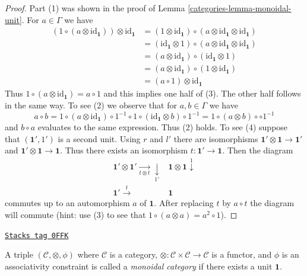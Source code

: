 \begin{proof}

Part (1) was shown in the proof of Lemma \ref{categories-lemma-monoidal-unit}.
For $a \in \Gamma$ we have
\begin{align*}
(1 \circ (a \otimes \text{id}_\mathbf{1})) \otimes \text{id}_\mathbf{1}
& =
(1 \otimes \text{id}_\mathbf{1}) \circ
(a \otimes \text{id}_\mathbf{1} \otimes \text{id}_\mathbf{1}) \\
& =
(\text{id}_\mathbf{1} \otimes 1) \circ
(a \otimes \text{id}_\mathbf{1} \otimes \text{id}_\mathbf{1}) \\
& =
(a \otimes \text{id}_\mathbf{1}) \circ
(\text{id}_\mathbf{1} \otimes 1) \\
& =
(a \otimes \text{id}_\mathbf{1}) \circ
(1 \otimes \text{id}_\mathbf{1}) \\
& =
(a \circ 1) \otimes \text{id}_\mathbf{1}
\end{align*}
Thus $1 \circ (a \otimes \text{id}_\mathbf{1}) = a \circ 1$
and this implies one half of (3). The other half follows in
the same way. To see (2) we observe that for $a, b \in \Gamma$
we have
$$
a \circ b =
1 \circ (a \otimes \text{id}_\mathbf{1}) \circ 1^{-1}
\circ
1 \circ (\text{id}_\mathbf{1} \otimes b) \circ 1^{-1}
=
1 \circ (a \otimes b) \circ \circ 1^{-1}
$$
and $b \circ a$ evaluates to the same expression. Thus (2) holds.
To see (4) suppose that $(\mathbf{1}', 1')$ is a second unit.
Using $r$ and $l'$ there are isomorphisms
$\mathbf{1}' \otimes \mathbf{1} \to \mathbf{1}'$ and
$\mathbf{1}' \otimes \mathbf{1} \to \mathbf{1}$. Thus
there exists an isomorphism $t : \mathbf{1}' \to \mathbf{1}$.
Then the diagram
$$
\begin{array}{cc}\mathbf{1}' \otimes \mathbf{1}' \underset{t \otimes t}{\longrightarrow}\underset{1'}{\downarrow} & \mathbf{1} \otimes \mathbf{1} \overset{1}{\downarrow} \\ \mathbf{1}' \overset{t}{\longrightarrow} & \mathbf{1}\end{array}
$$
commutes up to an automorphism $a$ of $\mathbf{1}$. After replacing
$t$ by $a \circ t$ the diagram will commute (hint: use (3) to see
that $1 \circ (a \otimes a) = a^2 \circ 1$).
\end{proof}

\begin{definition}
\label{categories-definition-monoidal-category}
\href{https://stacks.math.columbia.edu/tag/0FFK}{\texttt{Stacks tag 0FFK}}

A triple $(\mathcal{C}, \otimes, \phi)$ where $\mathcal{C}$ is a category,
$\otimes : \mathcal{C} \times \mathcal{C} \to \mathcal{C}$ is a functor,
and $\phi$ is an associativity constraint is called a {\it monoidal category}
if there exists a unit $\mathbf{1}$.
\end{definition}

